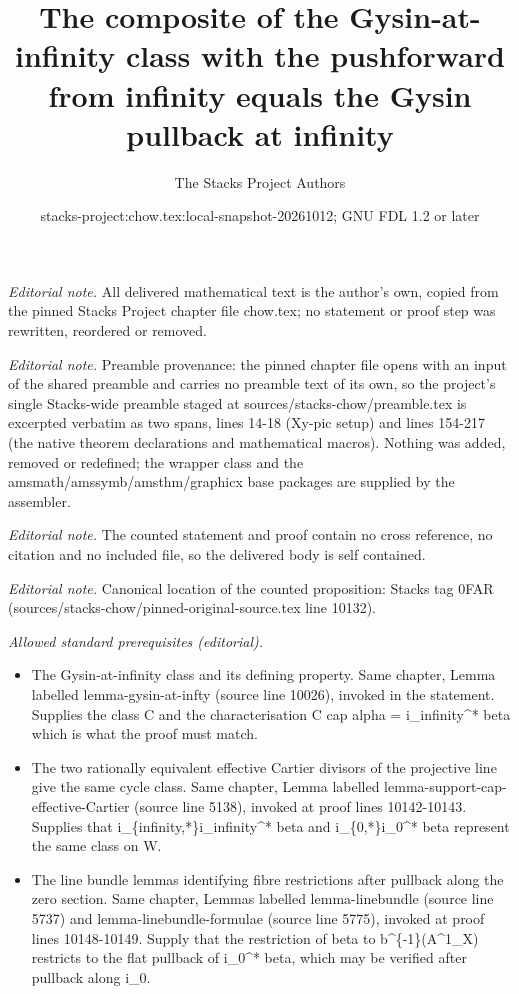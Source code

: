 \documentclass[10pt,a4paper]{amsart}
\title{The composite of the Gysin-at-infinity class with the pushforward from infinity equals the Gysin pullback at infinity}
\author{The Stacks Project Authors}
\date{stacks-project:chow.tex:local-snapshot-20261012; GNU FDL 1.2 or later}
\theoremstyle{plain}
\theoremstyle{definition}
\theoremstyle{remark}
\numberwithin{equation}{subsection}
\begin{document}
\maketitle
\noindent\textit{Editorial note.} All delivered mathematical text is the author's own, copied from the pinned Stacks Project chapter file chow.tex; no statement or proof step was rewritten, reordered or removed.\par\medskip
\noindent\textit{Editorial note.} Preamble provenance: the pinned chapter file opens with an input of the shared preamble and carries no preamble text of its own, so the project's single Stacks-wide preamble staged at sources/stacks-chow/preamble.tex is excerpted verbatim as two spans, lines 14-18 (Xy-pic setup) and lines 154-217 (the native theorem declarations and mathematical macros). Nothing was added, removed or redefined; the wrapper class and the amsmath/amssymb/amsthm/graphicx base packages are supplied by the assembler.\par\medskip
\noindent\textit{Editorial note.} The counted statement and proof contain no cross reference, no citation and no included file, so the delivered body is self contained.\par\medskip
\noindent\textit{Editorial note.} Canonical location of the counted proposition: Stacks tag 0FAR (sources/stacks-chow/pinned-original-source.tex line 10132).\par\medskip
\noindent\textit{Allowed standard prerequisites (editorial).}\begin{itemize}
\item The Gysin-at-infinity class and its defining property. Same chapter, Lemma labelled lemma-gysin-at-infty (source line 10026), invoked in the statement. Supplies the class C and the characterisation C cap alpha = i\_infinity\textasciicircum{}* beta which is what the proof must match.
\item The two rationally equivalent effective Cartier divisors of the projective line give the same cycle class. Same chapter, Lemma labelled lemma-support-cap-effective-Cartier (source line 5138), invoked at proof lines 10142-10143. Supplies that i\_\{infinity,*\}i\_infinity\textasciicircum{}* beta and i\_\{0,*\}i\_0\textasciicircum{}* beta represent the same class on W.
\item The line bundle lemmas identifying fibre restrictions after pullback along the zero section. Same chapter, Lemmas labelled lemma-linebundle (source line 5737) and lemma-linebundle-formulae (source line 5775), invoked at proof lines 10148-10149. Supply that the restriction of beta to b\textasciicircum{}\{-1\}(A\textasciicircum{}1\_X) restricts to the flat pullback of i\_0\textasciicircum{}* beta, which may be verified after pullback along i\_0.
\end{itemize}\medskip
\end{document}
